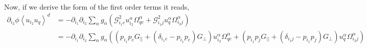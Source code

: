 {\begin{align}
\end{align}
Now, if we derive the form of the first order terms it reads,
\begin{align}
    \partial_{i_2} \phi \left< u_{i_2} u_q\right>^d
    &=
    -
    \partial_{i_1}\partial_{i_2}
        \sum_\alpha  g_\alpha
        \left(
            \mathcal{G}_{i_1 e}^{2} u^\alpha_{i_2}\Omega_{qe}^\alpha
            +\mathcal{G}_{i_1 j}^{2} u^\alpha_q\Omega_{i_{2}j}^\alpha
        \right)\\
    &=
    -
    \partial_{i_1}\partial_{i_2}
        \sum_\alpha  g_\alpha
        \left(
            (p_{i_1}p_e G_{||} + (\delta_{{i_1}e} - p_{i_1}p_e) G_{\bot}) u^\alpha_{i_2}\Omega_{qe}^\alpha
            +(p_{i_1}p_j G_{||} + (\delta_{{i_1}j} - p_{i_1}p_j) G_{\bot}) u^\alpha_q\Omega_{i_{2}j}^\alpha
        \right)
\end{align}

}
